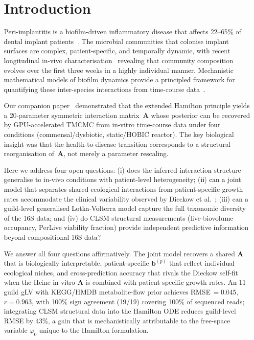 \documentclass[11pt,a4paper]{article}
\newcommand{\bA}{\mathbf{A}}
\newcommand{\bb}{\mathbf{b}}
\begin{document}
\section{Introduction}
\label{sec:intro}

Peri-implantitis is a biofilm-driven inflammatory disease that affects 22--65\% of dental implant patients~\cite{Dieckow2025InVivo}.
The microbial communities that colonise implant surfaces are complex, patient-specific, and temporally dynamic, with recent longitudinal in-vivo characterisation~\cite{Dieckow2025InVivo} revealing that community composition evolves over the first three weeks in a highly individual manner.
Mechanistic mathematical models of biofilm dynamics provide a principled framework for quantifying these inter-species interactions from time-course data~\cite{Klempt2025ContinuumBiofilm,JunkerBalzani2021ExtendedHamilton}.

Our companion paper~\cite{NishiokaTMCMC2025} demonstrated that the extended Hamilton principle yields a 20-parameter symmetric interaction matrix~$\bA$ whose posterior can be recovered by GPU-accelerated TMCMC from in-vitro time-course data under four conditions (commensal/dysbiotic, static/HOBIC reactor).
The key biological insight was that the health-to-disease transition corresponds to a structural reorganisation of~$\bA$, not merely a parameter rescaling.

Here we address four open questions: (i) does the inferred interaction structure generalise to in-vivo conditions with patient-level heterogeneity; (ii) can a joint model that separates shared ecological interactions from patient-specific growth rates accommodate the clinical variability observed by Dieckow et al.~\cite{Dieckow2025InVivo}; (iii) can a guild-level generalised Lotka-Volterra model capture the full taxonomic diversity of the 16S data; and (iv) do CLSM structural measurements (live-biovolume occupancy, PerLive viability fraction) provide independent predictive information beyond compositional 16S data?

We answer all four questions affirmatively.
The joint model recovers a shared $\bA$ that is biologically interpretable, patient-specific $\bb^{(p)}$ that reflect individual ecological niches, and cross-prediction accuracy that rivals the Dieckow self-fit when the Heine in-vitro $\bA$ is combined with patient-specific growth rates.
An 11-guild gLV with KEGG/HMDB metabolite-flow prior achieves RMSE\,$=0.045$, $r=0.963$, with 100\% sign agreement (19/19) covering 100\% of sequenced reads; integrating CLSM structural data into the Hamilton ODE reduces guild-level RMSE by 43\%, a gain that is mechanistically attributable to the free-space variable $\varphi_0$ unique to the Hamilton formulation.
\end{document}

